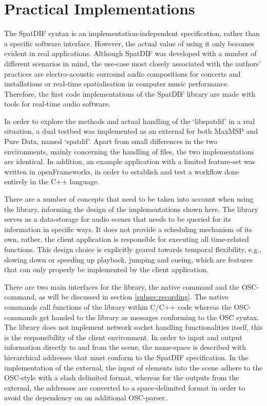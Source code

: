 \documentclass{article}
\begin{document}
\section{Practical Implementations}\label{practical_usage}

The SpatDIF syntax is an implementation-independent specification, rather than a specific software interface. 
However, the actual value of using it only becomes evident in real applications. 
Although SpatDIF was developed with a number of different scenarios in mind, the use-case most closely associated with the authors' practices are electro-acoustic surround audio compositions for concerts and installations or real-time spatialisation in computer music performance.
Therefore, the first code implementations of the SpatDIF library are made with tools for real-time audio software.

In order to explore the methods and actual handling of the `libspatdif' in a real situation, a dual testbed was implemented as an external for both MaxMSP and Pure Data, named `spatdif'.
Apart from small differences in the two environments, mainly concerning the handling of files, the two implementations are identical.
In addition, an example application with a limited feature-set was written in openFrameworks, in order to establish and test a workflow done entirely in the C++ language.

There are a number of concepts that need to be taken into account when using the library, informing the design of the implementations shown here.
The library serves as a data-storage for audio scenes that needs to be queried for its information in specific ways.
It does not provide a scheduling mechanism of its own, rather, the client application is responsible for executing all time-related functions.
This design choice is explicitly geared towards temporal flexibility, e.g., slowing down or speeding up playback, jumping and cueing, which are features that can only properly be implemented by the client application.

There are two main interfaces for the library, the native command and the OSC-command, as will be discussed in section \ref{subsec:recording}.
The native commands call functions of the library within C/C++ code whereas the OSC-commands get handed to the library as messages conforming to the OSC syntax.
The library does not implement network socket handling functionalities itself, this is the responsibility of the client environment.
In order to input and output information directly to and from the scene, the name-space is described with hierarchical addresses that must conform to the SpatDIF specification.
In the implementation of the external, the input of elements into the scene adhere to the OSC-style with a slash delimited format, whereas for the outputs from the external, the addresses are converted to a space-delimited format in order to avoid the dependency on an additional OSC-parser.
\end{document}
